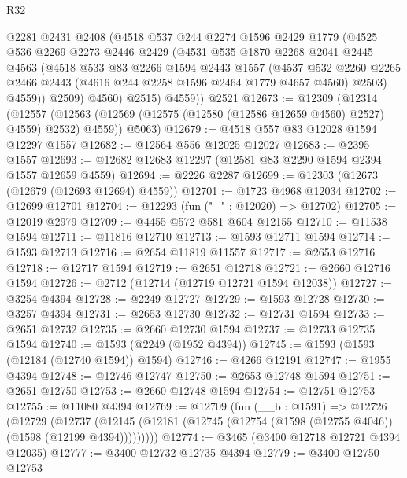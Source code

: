 \begin{lexlean}{R32}
\begin{coremodule}
          @2281
          @2431
          @2408
          (@4518
            @537
            @244
            @2274
            @1596
            @2429
            @1779
            (@4525
              @536
              @2269
              @2273
              @2446
              @2429
              (@4531
                @535
                @1870
                @2268
                @2041
                @2445
                @4563
                (@4518
                  @533
                  @83
                  @2266
                  @1594
                  @2443
                  @1557
                  (@4537
                    @532
                    @2260
                    @2265
                    @2466
                    @2443
                    (@4616 @244 @2258 @1596 @2464 @1779 @4657 @4560)
                    @2503)
                  @4559))
              @2509)
            @4560)
          @2515)
        @4559))
    @2521
@12673 := @12309
    (@12314
      (@12557 (@12563 (@12569 (@12575 (@12580 (@12586 @12659 @4560) @2527) @4559) @2532) @4559))
      @5063)
@12679 := @4518 @557 @83 @12028 @1594 @12297 @1557
@12682 := @12564 @556 @12025 @12027
@12683 := @2395 @1557
@12693 := @12682 @12683 @12297 (@12581 @83 @2290 @1594 @2394 @1557 @12659 @4559)
@12694 := @2226 @2287
@12699 := @12303 (@12673 (@12679 (@12693 @12694) @4559))
@12701 := @1723 @4968 @12034
@12702 := @12699 @12701
@12704 := @12293 (fun ("_" : @12020) => @12702)
@12705 := @12019 @2979
@12709 := @4455 @572 @581 @604 @12155
@12710 := @11538 @1594
@12711 := @11816 @12710
@12713 := @1593 @12711 @1594
@12714 := @1593 @12713
@12716 := @2654 @11819 @11557
@12717 := @2653 @12716
@12718 := @12717 @1594
@12719 := @2651 @12718
@12721 := @2660 @12716 @1594
@12726 := @2712 (@12714 (@12719 @12721 @1594 @12038))
@12727 := @3254 @4394
@12728 := @2249 @12727
@12729 := @1593 @12728
@12730 := @3257 @4394
@12731 := @2653 @12730
@12732 := @12731 @1594
@12733 := @2651 @12732
@12735 := @2660 @12730 @1594
@12737 := @12733 @12735 @1594
@12740 := @1593 (@2249 (@1952 @4394))
@12745 := @1593 (@1593 (@12184 (@12740 @1594)) @1594)
@12746 := @4266 @12191
@12747 := @1955 @4394
@12748 := @12746 @12747
@12750 := @2653 @12748 @1594
@12751 := @2651 @12750
@12753 := @2660 @12748 @1594
@12754 := @12751 @12753
@12755 := @11080 @4394
@12769 := @12709
    (fun (__b : @1591) =>
    @12726
      (@12729
        (@12737 (@12145 (@12181 (@12745 (@12754 (@1598 (@12755 @4046)) (@1598 (@12199 @4394)))))))))
@12774 := @3465 (@3400 @12718 @12721 @4394 @12035)
@12777 := @3400 @12732 @12735 @4394
@12779 := @3400 @12750 @12753

\end{coremodule}
\end{lexlean}
